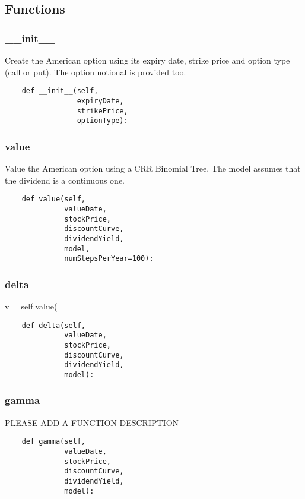 \documentclass[twoside,11pt]{book}
\begin{document}
\subsection*{Functions}

\subsubsection*{{\bf \_\_init\_\_}}
Create the American option using its expiry date, strike price and option type (call or put). The option notional is provided too.  

\begin{lstlisting}
    def __init__(self,
                 expiryDate,
                 strikePrice,
                 optionType):
\end{lstlisting}

\subsubsection*{{\bf value}}
Value the American option using a CRR Binomial Tree. The model assumes that the dividend is a continuous one.  

\begin{lstlisting}
    def value(self,
              valueDate,
              stockPrice,
              discountCurve,
              dividendYield,
              model,
              numStepsPerYear=100):
\end{lstlisting}

\subsubsection*{{\bf delta}}
v = self.value( 

\begin{lstlisting}
    def delta(self,
              valueDate,
              stockPrice,
              discountCurve,
              dividendYield,
              model):
\end{lstlisting}

\subsubsection*{{\bf gamma}}
PLEASE ADD A FUNCTION DESCRIPTION

\begin{lstlisting}
    def gamma(self,
              valueDate,
              stockPrice,
              discountCurve,
              dividendYield,
              model):
\end{lstlisting}
\end{document}
